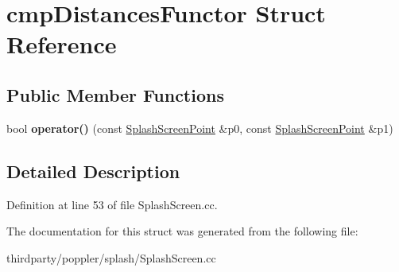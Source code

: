 \hypertarget{structcmp_distances_functor}{}\section{cmp\+Distances\+Functor Struct Reference}
\label{structcmp_distances_functor}
\subsection*{Public Member Functions}
\begin{DoxyCompactItemize}
\item 
\mbox{\label{structcmp_distances_functor_a14a808f9fc061999af12ade13dcce054}} 
bool {\bfseries operator()} (const \hyperlink{struct_splash_screen_point}{Splash\+Screen\+Point} \&p0, const \hyperlink{struct_splash_screen_point}{Splash\+Screen\+Point} \&p1)
\end{DoxyCompactItemize}


\subsection{Detailed Description}


Definition at line 53 of file Splash\+Screen.\+cc.



The documentation for this struct was generated from the following file\+:\begin{DoxyCompactItemize}
\item 
thirdparty/poppler/splash/Splash\+Screen.\+cc\end{DoxyCompactItemize}
